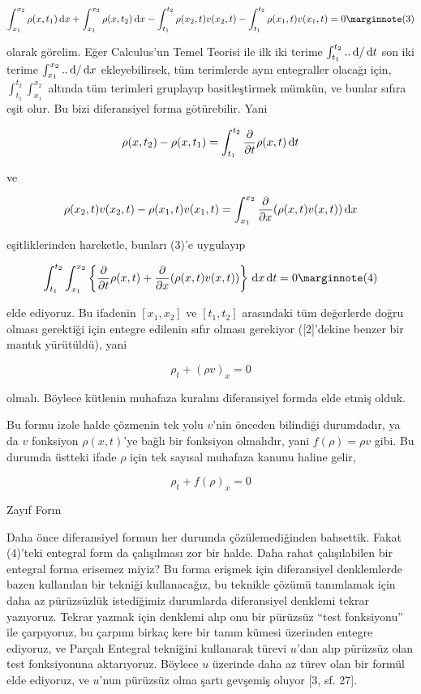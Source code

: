 \documentclass[12pt,fleqn]{article}\usepackage{../../common}
\begin{document}
$$
\int _{x_1}^{x_2} \rho(x,t_1) \ud x  +
\int _{x_1}^{x_2} \rho(x,t_2) \ud x -
\int_{t_1}^{t_2}  \rho(x_2,t) v(x_2,t) -
\int_{t_1}^{t_2} \rho(x_1,t) v(x_1,t) = 0
\mlabel{3}
$$

olarak görelim. Eğer Calculus'un Temel Teorisi ile ilk iki terime
$\int_{t_1}^{t_2} .. \,\mathrm{d} / \,\mathrm{d} t$ son iki terime $\int_{x_1}^{x_2} .. \,\mathrm{d} / \,\mathrm{d} x$
ekleyebilirsek, tüm terimlerde aynı entegraller olacağı için, 
$\int_{t_1}^{t_2} \int_{x_1}^{x_2} $ altında tüm terimleri gruplayıp
basitleştirmek mümkün, ve bunlar sıfıra eşit olur. Bu bizi diferansiyel
forma götürebilir. Yani

$$
\rho(x,t_2) - \rho(x,t_1) = \int_{t_1}^{t_2}
\frac{\partial }{\partial t} \rho(x,t) \,\mathrm{d} t
$$

ve

$$
\rho(x_2,t)v(x_2,t) - \rho(x_1,t)v(x_1,t) =
\int _{x_1}^{x_2} \frac{\partial }{\partial x} (\rho(x,t)v(x,t)) \,\mathrm{d} x
$$

eşitliklerinden hareketle, bunları (3)'e uygulayıp

$$
\int _{t_1}^{t_2} \int _{x_1}^{x_2}  \left\{
\frac{\partial }{\partial t} \rho(x,t)  +
\frac{\partial }{\partial x} (\rho(x,t)v(x,t))
\right\} \ud x \ud t = 0
\mlabel{4}
$$

elde ediyoruz. Bu ifadenin $[x_1,x_2]$ ve $[t_1,t_2]$ arasındaki tüm değerlerde
doğru olması gerektiği için entegre edilenin sıfır olması gerekiyor ([2]'dekine
benzer bir mantık yürütüldü), yani

$$
\rho_t + (\rho v)_x = 0
$$

olmalı. Böylece kütlenin muhafaza kuralını diferansiyel formda elde etmiş olduk.

Bu formu izole halde çözmenin tek yolu $v$'nin önceden bilindiği durumdadır, ya
da $v$ fonksiyon $\rho(x,t)$'ye bağlı bir fonksiyon olmalıdır, yani
$f(\rho) = \rho v$ gibi. Bu durumda üstteki ifade $\rho$ için tek sayısal
muhafaza kanunu haline gelir,

$$
\rho_t + f(\rho)_x = 0
$$

Zayıf Form

Daha önce diferansiyel formun her durumda çözülemediğinden bahsettik. Fakat
(4)'teki entegral form da çalışılması zor bir halde. Daha rahat çalışılabilen
bir entegral forma erisemez miyiz? Bu forma erişmek için diferansiyel
denklemlerde bazen kullanılan bir tekniği kullanacağız, bu teknikle çözümü
tanımlamak için daha az pürüzsüzlük istediğimiz durumlarda diferansiyel denklemi
tekrar yazıyoruz. Tekrar yazmak için denklemi alıp onu bir pürüzsüz ``test
fonksiyonu'' ile çarpıyoruz, bu çarpımı birkaç kere bir tanım kümesi üzerinden
entegre ediyoruz, ve Parçalı Entegral tekniğini kullanarak türevi $u$'dan alıp
pürüzsüz olan test fonksiyonuna aktarıyoruz. Böylece $u$ üzerinde daha az
türev olan bir formül elde ediyoruz, ve $u$'nun pürüzsüz olma şartı gevşemiş
oluyor [3, sf. 27].
\end{document}
